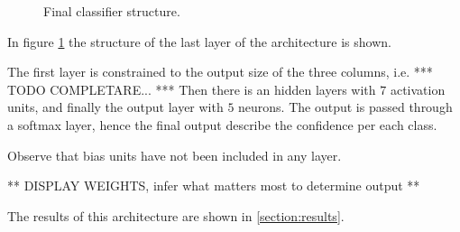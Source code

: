\begin{figure}
            \caption{Final classifier structure.}\label{fig:mc-cnn:final-classifier-structure}
        \end{figure}
        \par{
            In figure \ref{fig:mc-cnn:final-classifier-structure} the structure of the last layer of the architecture is shown.
        }
        \par{
            The first layer is constrained to the output size of the three columns, i.e. *** TODO COMPLETARE... *** Then there is an hidden layers with $7$ activation units, and finally the output layer with $5$ neurons. The output is passed through a softmax layer, hence the final output describe the confidence per each class.
        }
        \par{
            Observe that bias units have not been included in any layer.
        }
        \par{
            ** DISPLAY WEIGHTS, infer what matters most to determine output **
        }
        \par{
            The results of this architecture are shown in \ref{section:results}.
        }
